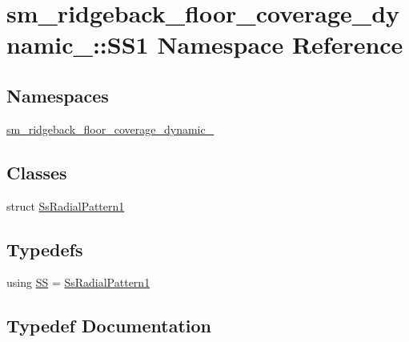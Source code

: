 \hypertarget{namespacesm__ridgeback__floor__coverage__dynamic__1_1_1SS1}{}\section{sm\+\_\+ridgeback\+\_\+floor\+\_\+coverage\+\_\+dynamic\+\_\+:\+:S\+S1 Namespace Reference}
\label{namespacesm__ridgeback__floor__coverage__dynamic__1_1_1SS1}
\subsection*{Namespaces}
\begin{DoxyCompactItemize}
\item 
 \hyperlink{namespacesm__ridgeback__floor__coverage__dynamic__1_1_1SS1_1_1sm__ridgeback__floor__coverage__dynamic__1}{sm\+\_\+ridgeback\+\_\+floor\+\_\+coverage\+\_\+dynamic\+\_}
\end{DoxyCompactItemize}
\subsection*{Classes}
\begin{DoxyCompactItemize}
\item 
struct \hyperlink{structsm__ridgeback__floor__coverage__dynamic__1_1_1SS1_1_1SsRadialPattern1}{Ss\+Radial\+Pattern1}
\end{DoxyCompactItemize}
\subsection*{Typedefs}
\begin{DoxyCompactItemize}
\item 
using \hyperlink{namespacesm__ridgeback__floor__coverage__dynamic__1_1_1SS1_ab7908a02f2d8b027694a0e185b770dac}{SS} = \hyperlink{structsm__ridgeback__floor__coverage__dynamic__1_1_1SS1_1_1SsRadialPattern1}{Ss\+Radial\+Pattern1}
\end{DoxyCompactItemize}


\subsection{Typedef Documentation}
\mbox{\label{namespacesm__ridgeback__floor__coverage__dynamic__1_1_1SS1_ab7908a02f2d8b027694a0e185b770dac}} 
